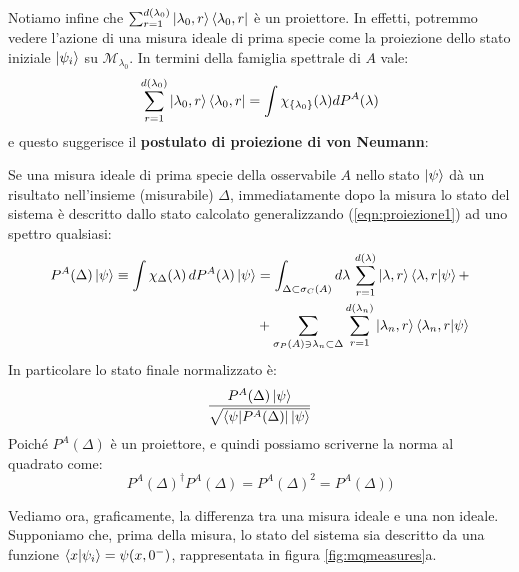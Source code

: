 \documentclass[../../FisicaTeorica.tex]{subfiles}
\begin{document}
Notiamo infine che $\sum_{r=1}^{d(\lambda_0)}\ket{\lambda_0,r}\bra{\lambda_0,r}$ è un proiettore. In effetti, potremmo vedere l'azione di una misura ideale di prima specie come la proiezione dello stato iniziale $\ket{\psi_i}$ su $\mathcal{M}_{\lambda_0}$. In termini della famiglia spettrale di $A$ vale:
\begin{equation}
\sum_{r=1}^{d(\lambda_0)} \ket{\lambda_0,r}\bra{\lambda_0,r} = \int \chi_{\{\lambda_0\}}(\lambda) dP^A(\lambda)
\label{eqn:proiezione1}
\end{equation}
e questo suggerisce il \textbf{postulato di proiezione di von Neumann}:\\
\begin{axi}
Se una misura ideale di prima specie della osservabile $A$ nello stato $\ket{\psi}$ dà un risultato nell'insieme (misurabile) $\Delta$, immediatamente dopo la misura lo stato del sistema è descritto dallo stato calcolato generalizzando (\ref{eqn:proiezione1}) ad uno spettro qualsiasi:
\begin{align*}
P^A(\Delta)\ket{\psi} \equiv \int \chi_\Delta(\lambda)\,dP^A(\lambda)\ket{\psi}&=\int_{\Delta \subset \sigma_C(A)} d\lambda\, \sum_{r=1}^{d(\lambda)}\ket{\lambda,r}\braket{\lambda,r|\psi}+\\
&+ \sum_{\sigma_P(A)\ni \lambda_n \subset \Delta} \sum_{r=1}^{d(\lambda_n)} \ket{\lambda_n,r}\braket{\lambda_n,r|\psi}
\end{align*}
In particolare lo stato finale normalizzato è:
\[
\frac{P^A(\Delta)\ket{\psi}}{\sqrt{\bra{\psi|P^A(\Delta)}\ket{\psi}}}
\]
Poiché $P^A(\Delta)$ è un proiettore, e quindi possiamo scriverne la norma al quadrato come:
\[
P^A(\Delta)^\dag P^A(\Delta)=P^A(\Delta)^2=P^A(\Delta))
\]
\end{axi}

Vediamo ora, graficamente, la differenza tra una misura ideale e una non ideale.\\
Supponiamo che, prima della misura, lo stato del sistema sia descritto da una funzione $\braket{x|\psi_i} = \psi(x,0^-)$, rappresentata in figura \ref{fig:mqmeasures}a.
\end{document}
